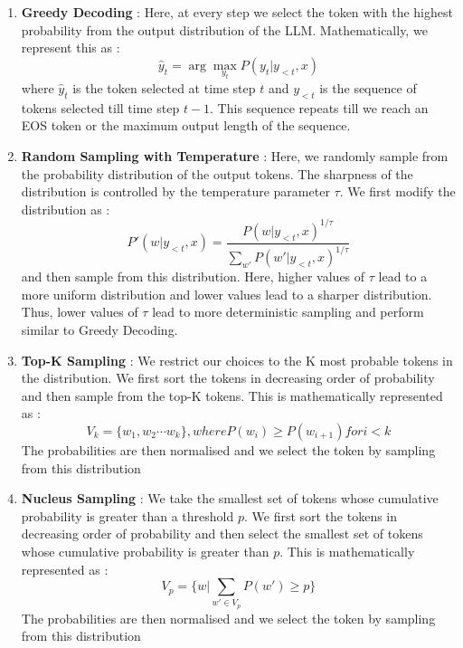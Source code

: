 \documentclass[12pt]{article}
\begin{document}
\begin{enumerate}
    \item \textbf{Greedy Decoding} : Here, at every step we select the token with the highest probability from the output distribution of the LLM. Mathematically, we represent this as :
    \begin{equation}
        \hat{y}_t = \arg\max_{y_t} P(y_t | y_{<t}, x)
    \end{equation}
    where $\hat{y}_t$ is the token selected at time step $t$ and $y_{<t}$ is the sequence of tokens selected till time step $t-1$. This sequence repeats till we reach an EOS token or the maximum output length of the sequence.

    \item \textbf{Random Sampling with Temperature} : Here, we randomly sample from the probability distribution of the output tokens. The sharpness of the distribution is controlled by the temperature parameter $\tau$. We first modify the distribution as :
    \begin{equation}
        P'(w|y_{<t}, x) = \displaystyle\frac{P(w|y_{<t}, x)^{1/\tau}}{\sum_{w'} P(w'|y_{<t}, x)^{1/\tau}}
    \end{equation}
    and then sample from this distribution. Here, higher values of $\tau$ lead to a more uniform distribution and lower values lead to a sharper distribution. Thus, lower values of $\tau$ lead to more deterministic sampling and perform similar to Greedy Decoding.

    \item \textbf{Top-K Sampling} : We restrict our choices to the K most probable tokens in the distribution. We first sort the tokens in decreasing order of probability and then sample from the top-K tokens. This is mathematically represented as :
    \begin{equation}
        V_k = \{ w_1, w_2 \cdots w_k \}, where P(w_i) \geq P(w_{i+1}) for i < k
    \end{equation}
    The probabilities are then normalised and we select the token by sampling from this distribution

    \item \textbf{Nucleus Sampling} : We take the smallest set of tokens whose cumulative probability is greater than a threshold $p$. We first sort the tokens in decreasing order of probability and then select the smallest set of tokens whose cumulative probability is greater than $p$. This is mathematically represented as :
    \begin{equation}
        V_p = \{ w | \sum_{w' \in V_p} P(w') \geq p \}
    \end{equation}
    The probabilities are then normalised and we select the token by sampling from this distribution
\end{enumerate}
\end{document}
